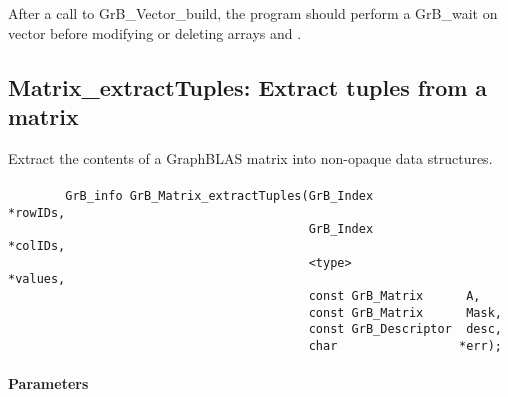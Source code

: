 
After a call to {\sf GrB\_Vector\_build}, the program should perform a 
{\sf GrB\_wait} on vector  before
modifying or deleting arrays  and .


\subsection{{\sf Matrix\_extractTuples}: Extract tuples from a matrix}
\label{Sec:Matrix_extractTuples}

Extract the contents of a GraphBLAS matrix into non-opaque data structures.

\paragraph{\syntax}

\begin{verbatim}
        GrB_info GrB_Matrix_extractTuples(GrB_Index            *rowIDs,
                                          GrB_Index            *colIDs,
                                          <type>               *values, 
                                          const GrB_Matrix      A,
                                          const GrB_Matrix      Mask,
                                          const GrB_Descriptor  desc,
                                          char                 *err);
\end{verbatim}

\paragraph{Parameters}

